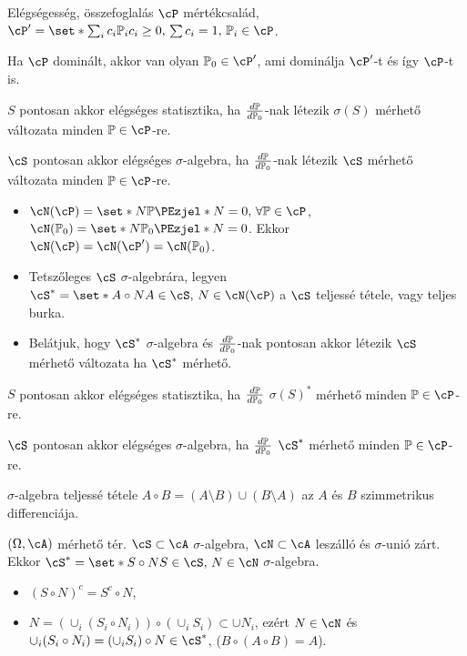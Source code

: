 \documentclass[aspectratio=169,notheorems,9pt,\option]{beamer}
\begin{document}
\begin{frame}{Elégségesség, összefoglalás}
  $\cP$ mértékcsalád, $\cP'=\set*{\sum_{i} c_i\P[i]}{c_i\geq0,\,\sum c_i=1,\,\P[i]\in\cP}$.
  \begin{proposition}
    Ha $\cP$ dominált, akkor van olyan $\P[0]\in\cP'$, ami dominálja $\cP'$-t és így $\cP$-t is.
  \end{proposition}
  \begin{proposition}
    $S$  pontosan akkor elégséges statisztika, 
    ha $\frac{d\P}{d\P[0]}$-nak létezik $\sigma(S)$ mérhető változata minden $\P\in\cP$-re.
 
    $\cS$  pontosan akkor elégséges $\sigma$-algebra, 
    ha $\frac{d\P}{d\P[0]}$-nak létezik $\cS$ mérhető változata minden $\P\in\cP$-re.
  \end{proposition}

  \begin{itemize}
    \item $\cN(\cP)=\set*{N}{\P{N}=0,\,\forall \P\in\cP}$, $\cN(\P[0])=\set*{N}{\P[0]{N}=0}$. 
    Ekkor $\cN(\cP)=\cN(\cP')=\cN(\P[0])$.
    \item Tetszőleges $\cS$ $\sigma$-algebrára, legyen 
    $\cS^*=\set*{A\circ N}{A\in\cS,\,N\in\cN(\cP)}$ a $\cS$ teljessé tétele, vagy teljes burka.
    \item Belátjuk, hogy $\cS^*$ $\sigma$-algebra és 
     $\frac{d\P}{d\P[0]}$-nak pontosan akkor létezik $\cS$ mérhető változata
    ha $\cS^*$ mérhető.
  \end{itemize}

  \begin{proposition}
    $S$  pontosan akkor elégséges statisztika, 
    ha $\frac{d\P}{d\P[0]}$  $\sigma(S)^*$ mérhető minden $\P\in\cP$-re.
 
    $\cS$  pontosan akkor elégséges $\sigma$-algebra, 
    ha $\frac{d\P}{d\P[0]}$  $\cS^*$ mérhető minden $\P\in\cP$-re.
  \end{proposition}

\end{frame}

\begin{frame}{$\sigma$-algebra teljessé tétele}
  $A\circ B=(A\setminus B)\cup(B\setminus A)$ az $A$ és $B$ szimmetrikus differenciája.
  \begin{proposition}
    $(\Omega,\cA)$ mérhető tér. $\cS\subset\cA$ $\sigma$-algebra, 
    $\cN\subset\cA$ leszálló és $\sigma$-unió zárt. Ekkor
    $\cS^*=\set*{S\circ N}{S\in\cS,\,N\in\cN}$ $\sigma$-algebra.
  \end{proposition}
  \begin{itemize}
    \item $(S\circ N)^c=S^c\circ N$,
    \item $N=(\cup_i (S_i\circ N_i))\circ (\cup_i S_i)\subset \cup N_i$, ezért $N\in\cN$ és
    $\cup_i (S_i\circ N_i)= (\cup_i S_i)\circ N\in\cS^*$, ($B\circ(A\circ B)=A$).
  \end{itemize}
\end{frame}
\end{document}
